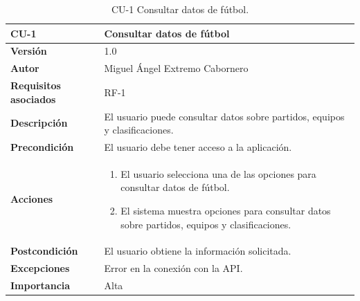 \begin{table}[h!]
    \centering
    \begin{tabularx}{\linewidth}{ p{} p{} }
        \toprule
        \textbf{CU-1}    & \textbf{Consultar datos de fútbol}\\
        \toprule
        \textbf{Versión}              & 1.0    \\
        \textbf{Autor}                & Miguel Ángel Extremo Cabornero \\
        \textbf{Requisitos asociados} & RF-1 \\
        \textbf{Descripción}          & El usuario puede consultar datos sobre partidos, equipos y clasificaciones. \\
        \textbf{Precondición}         & El usuario debe tener acceso a la aplicación. \\
        \textbf{Acciones}             &
        \begin{enumerate}
            \item El usuario selecciona una de las opciones para consultar datos de fútbol.
            \item El sistema muestra opciones para consultar datos sobre partidos, equipos y clasificaciones.
        \end{enumerate}\\
        \textbf{Postcondición}        & El usuario obtiene la información solicitada. \\
        \textbf{Excepciones}          & Error en la conexión con la API. \\
        \textbf{Importancia}          & Alta \\
        \bottomrule
    \end{tabularx}
    \caption{CU-1 Consultar datos de fútbol.}
\end{table}


